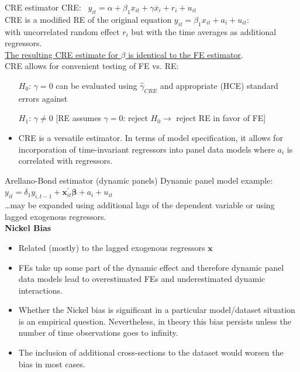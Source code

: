 \documentclass[usenames,dvipsnames]{beamer}
\begin{document}
\begin{frame}{CRE estimator}
CRE: \ $y_{it} = \alpha + \beta_1 x_{it} + \gamma \overline{x}_i + r_i + u_{it}$ \\
\medskip
\small CRE is a modified RE of the original equation $y_{it} =  \beta_1 x_{it} + a_i + u_{it}$: \\
\vspace{0.2cm}
with uncorrelated random effect $r_i$ but with the time averages as additional regressors. \\
\vspace{0.3cm}
\underline{The resulting CRE estimate for $\beta$ is identical to the FE estimator}. \\ \medskip
CRE allows for convenient testing of FE vs. RE:
	\begin{itemize}
	\item[$H_0$:] $\gamma = 0$ can be evaluated using $\hat{\gamma}_{\textit{CRE}}$ and appropriate (HCE) standard errors against
	\item[$H_1$:] $\gamma \neq 0$ [RE assumes $\gamma = 0$: reject $H_0\rightarrow$ reject RE in favor of FE]
	\end{itemize}

\begin{itemize}
    \item CRE is a versatile estimator. In terms of model specification, it allows for incorporation of time-invariant regressors into panel data models where $a_i$ is correlated with regressors.
\end{itemize}
\end{frame}
\begin{frame}{Arellano-Bond estimator (dynamic panels)}
Dynamic panel model example:\\
\medskip
$y_{it} = \delta_1 y_{i,t-1} + \bm{x}^{\prime}_{it} \bm{\beta} + a_i + u_{it}$\\
\medskip
\dots may be expanded using additional lags of the dependent variable or using lagged exogenous regressors.\\
\medskip
\small
\textbf{Nickel Bias}
\begin{itemize}
\item Related (mostly) to the lagged exogenous regressors $\bm{x}$
\item FEs take up some part of the dynamic effect and therefore dynamic panel data models lead to overestimated FEs and underestimated dynamic interactions. 
\item Whether the Nickel bias is significant in a particular model/dataset situation is an empirical question. Nevertheless, in theory this bias persists unless the number of time observations goes to infinity.
\item The inclusion of additional cross-sections to the dataset would worsen the bias in most cases.
\end{itemize}
\end{frame}
\end{document}
